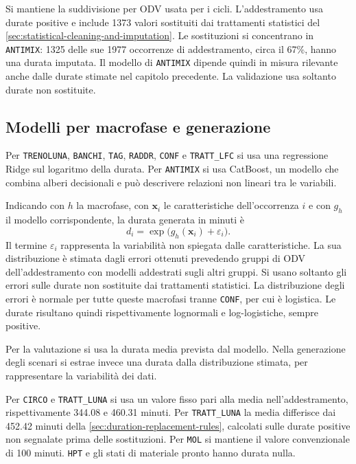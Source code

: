 Si mantiene la suddivisione per ODV usata per i cicli. L'addestramento usa durate positive e include \num{1373} valori sostituiti dai trattamenti statistici del \cref{sec:statistical-cleaning-and-imputation}. Le sostituzioni si concentrano in \texttt{ANTIMIX}: \num{1325} delle sue \num{1977} occorrenze di addestramento, circa il 67\%, hanno una durata imputata. Il modello di \texttt{ANTIMIX} dipende quindi in misura rilevante anche dalle durate stimate nel capitolo precedente. La validazione usa soltanto durate non sostituite.

\subsection{Modelli per macrofase e generazione}
\label{sec:duration-generation-models}

Per \texttt{TRENOLUNA}, \texttt{BANCHI}, \texttt{TAG}, \texttt{RADDR}, \texttt{CONF} e \texttt{TRATT\_LFC} si usa una regressione Ridge sul logaritmo della durata. Per \texttt{ANTIMIX} si usa CatBoost, un modello che combina alberi decisionali e può descrivere relazioni non lineari tra le variabili.

Indicando con $h$ la macrofase, con $\bm{x}_i$ le caratteristiche dell'occorrenza $i$ e con $g_h$ il modello corrispondente, la durata generata in minuti è
\begin{equation}
\label{eq:duration-generation-law}
d_i=\exp\bigl(g_h(\bm{x}_i)+\varepsilon_i\bigr).
\end{equation}
Il termine $\varepsilon_i$ rappresenta la variabilità non spiegata dalle caratteristiche. La sua distribuzione è stimata dagli errori ottenuti prevedendo gruppi di ODV dell'addestramento con modelli addestrati sugli altri gruppi. Si usano soltanto gli errori sulle durate non sostituite dai trattamenti statistici. La distribuzione degli errori è normale per tutte queste macrofasi tranne \texttt{CONF}, per cui è logistica. Le durate risultano quindi rispettivamente lognormali e log-logistiche, sempre positive.

Per la valutazione si usa la durata media prevista dal modello. Nella generazione degli scenari si estrae invece una durata dalla distribuzione stimata, per rappresentare la variabilità dei dati.

Per \texttt{CIRCO} e \texttt{TRATT\_LUNA} si usa un valore fisso pari alla media nell'addestramento, rispettivamente \num{344.08} e \num{460.31} minuti. Per \texttt{TRATT\_LUNA} la media differisce dai \num{452.42} minuti della \cref{sec:duration-replacement-rules}, calcolati sulle durate positive non segnalate prima delle sostituzioni. Per \texttt{MOL} si mantiene il valore convenzionale di 100 minuti. \texttt{HPT} e gli stati di materiale pronto hanno durata nulla.

